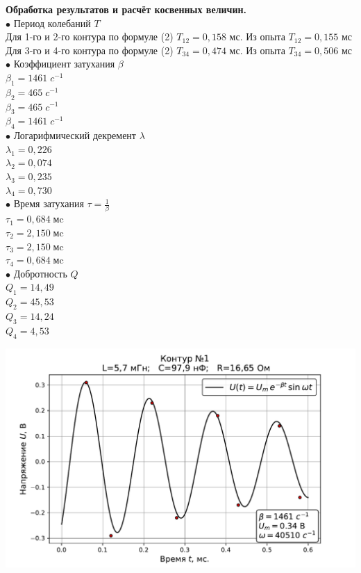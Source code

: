 \documentclass[ a4paper]{article}
\begin{document}
{\parindent=0pt\textbf{Обработка результатов и расчёт косвенных величин.}}\\
{\parindent=0pt
$\bullet$ Период колебаний $T$\\
Для 1-го и 2-го контура по формуле (2)  $T_{12}  = 0,158$ мс. Из опыта $T_{12}=0,155$ мс\\
Для 3-го и 4-го контура по формуле (2)  $T_{34}  = 0,474$ мс. Из опыта $T_{34}=0,506$ мс\\

$\bullet$ Коэффициент затухания $\beta$ \\
$\beta_1=1461\;c^{-1}$\\
$\beta_2=465\;c^{-1}$\\
$\beta_3=465\;c^{-1}$\\
$\beta_4=1461\;c^{-1}$\\

$\bullet$ Логарифмический декремент $\lambda$\\
$\lambda_1=0,226$\\
$\lambda_2=0,074$\\
$\lambda_3=0,235$\\
$\lambda_4=0,730$\\

$\bullet$ Время затухания $\tau=\frac{1}{\beta}$\\
$\tau_1=0,684\;\mbox{мc}$\\
$\tau_2=2,150\;\mbox{мc}$\\
$\tau_3=2,150\;\mbox{мc}$\\
$\tau_4=0,684\;\mbox{мc}$\\

$\bullet$ Добротность $Q$\\
$Q_1=14,49$\\
$Q_2=45,53$\\
$Q_3=14,24$\\
$Q_4=4,53$\\
}
\begin{center}
		\includegraphics[scale=0.7]{1.pdf}
\end{center}
\end{document}
